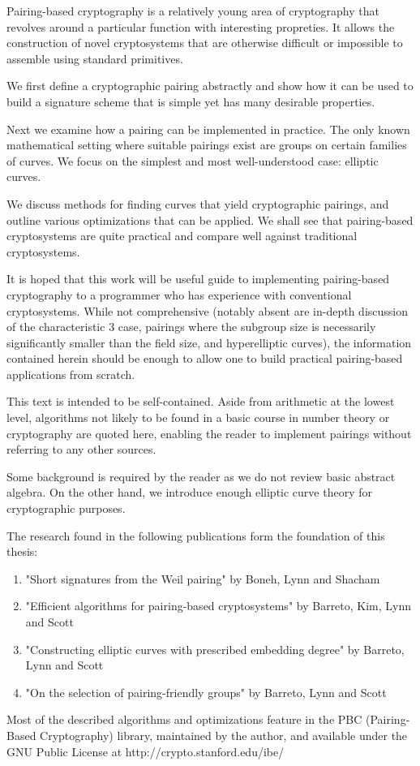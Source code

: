 \beforepreface
{}
Pairing-based cryptography is a relatively young area of cryptography that
revolves around a particular function with interesting propreties.
It allows the construction of novel cryptosystems that are otherwise
difficult or impossible to assemble using standard primitives.

We first define a cryptographic pairing abstractly and show how it
can be used to build a signature scheme that is simple yet has many
desirable properties.

Next we examine how a pairing can be implemented in practice. The only known
mathematical setting where suitable pairings exist are groups on certain
families of curves. We focus on the simplest and most well-understood case:
elliptic curves.

We discuss methods for finding curves that yield cryptographic pairings,
and outline various optimizations that can be applied. We shall see that
pairing-based cryptosystems are quite practical and compare well against
traditional cryptosystems.

It is hoped that this work will be useful guide to implementing pairing-based
cryptography to a programmer who has experience with conventional
cryptosystems. While not comprehensive (notably absent are in-depth
discussion of the characteristic 3 case, pairings where
the subgroup size is necessarily significantly smaller than the field size,
and hyperelliptic curves),
the information contained herein should be enough to allow one to build
practical pairing-based applications from scratch.

This text is intended to be self-contained. Aside from
arithmetic at the lowest level, algorithms not likely to
be found in a basic course in number theory or cryptography are quoted here,
enabling the reader to implement pairings without referring to any other
sources.

Some background is required by the reader as
we do not review basic abstract algebra.
On the other hand, we introduce enough elliptic curve theory for
cryptographic purposes.

The research found in the following publications
form the foundation of this thesis:
\begin{enumerate}
\item "Short signatures from the Weil pairing" by Boneh, Lynn and Shacham~\cite{bls}
\item "Efficient algorithms for pairing-based cryptosystems" by Barreto, Kim, Lynn and Scott~\cite{bakls}
\item "Constructing elliptic curves with prescribed embedding degree" by Barreto, Lynn and Scott~\cite{bals}
\item "On the selection of pairing-friendly groups" by Barreto, Lynn and Scott~\cite{bals2}
\end{enumerate}

Most of the described algorithms and optimizations
feature in the PBC (Pairing-Based Cryptography) library, maintained by the
author, and available under the GNU Public License at 
http://crypto.stanford.edu/ibe/
